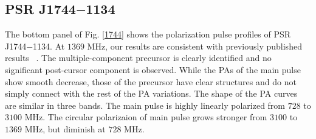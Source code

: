 \documentclass[useAMS,usenatbib]{mn2e}
\begin{document}

%


\subsection{PSR J1744$-$1134}

The bottom panel of Fig. \ref{1744} shows the polarization pulse profiles of 
PSR J1744$-$1134.
%
At $1369$ MHz, our results are consistent with previously published results
~\citep{Yan11}.
%
The multiple-component precursor is clearly identified and no significant 
post-cursor component is observed.
%
While the PAs of the main pulse show smooth decrease, those of the precursor 
have clear structures and do not simply connect with the rest of the PA 
variations.
%
The shape of the PA curves are similar in three bands.
%
The main pulse is highly linearly polarized from $728$ to $3100$ MHz. 
The circular polarizaion of main pulse grows stronger from $3100$ to $1369$ MHz, 
but diminish at $728$ MHz.
\end{document}
